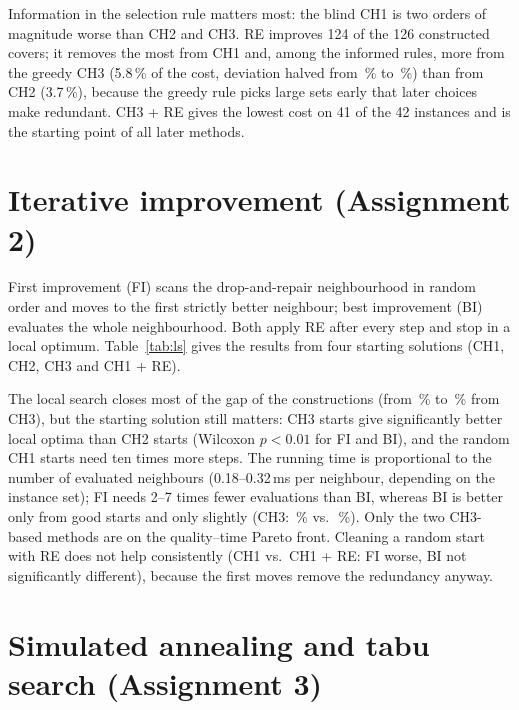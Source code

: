 \documentclass[11pt,a4paper]{article}
\begin{document}


Information in the selection rule matters most: the blind CH1 is two orders of magnitude worse than CH2 and CH3. RE improves 124 of the 126 constructed covers; it removes the most from CH1 and, among the informed rules, more from the greedy CH3 (5.8\,\% of the cost, deviation halved from \aOneCHthree\,\% to \aOneCHthreeRE\,\%) than from CH2 (3.7\,\%), because the greedy rule picks large sets early that later choices make redundant. CH3 + RE gives the lowest cost on 41 of the 42 instances and is the starting point of all later methods.

\section{Iterative improvement (Assignment 2)}\label{sec:ls}
First improvement (FI) scans the drop-and-repair neighbourhood in random order and moves to the first strictly better neighbour; best improvement (BI) evaluates the whole neighbourhood. Both apply RE after every step and stop in a local optimum. Table~\ref{tab:ls} gives the results from four starting solutions (CH1, CH2, CH3 and CH1 + RE).



The local search closes most of the gap of the constructions (from \aOneCHthree\,\% to \aTwoCHthreeBI\,\% from CH3), but the starting solution still matters: CH3 starts give significantly better local optima than CH2 starts (Wilcoxon $p<0.01$ for FI and BI), and the random CH1 starts need ten times more steps.
The running time is proportional to the number of evaluated neighbours (0.18--0.32\,ms per neighbour, depending on the instance set); FI needs 2--7 times fewer evaluations than BI, whereas BI is better only from good starts and only slightly (CH3: \aTwoCHthreeBI\,\% vs.\ \aTwoCHthreeFI\,\%). Only the two CH3-based methods are on the quality--time Pareto front.
Cleaning a random start with RE does not help consistently (CH1 vs.\ CH1 + RE: FI worse, BI not significantly different), because the first moves remove the redundancy anyway.

\section{Simulated annealing and tabu search (Assignment 3)}\label{sec:sa_ts}
\end{document}
